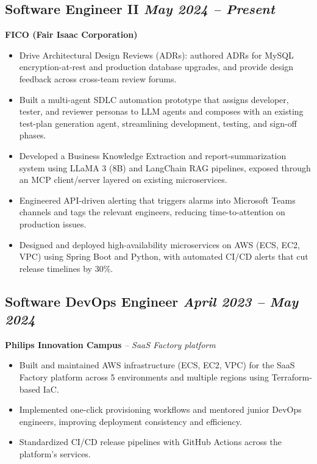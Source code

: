 \documentclass[11pt,a4paper]{article}
\begin{document}
\subsection{Software Engineer II \hfill \textit{May 2024 -- Present}}
\textbf{FICO (Fair Isaac Corporation)}
\begin{itemize}
    \item Drive Architectural Design Reviews (ADRs): authored ADRs for MySQL encryption-at-rest and production database upgrades, and provide design feedback across cross-team review forums.
    \item Built a multi-agent SDLC automation prototype that assigns developer, tester, and reviewer personas to LLM agents and composes with an existing test-plan generation agent, streamlining development, testing, and sign-off phases.
    \item Developed a Business Knowledge Extraction and report-summarization system using LLaMA 3 (8B) and LangChain RAG pipelines, exposed through an MCP client/server layered on existing microservices.
    \item Engineered API-driven alerting that triggers alarms into Microsoft Teams channels and tags the relevant engineers, reducing time-to-attention on production issues.
    \item Designed and deployed high-availability microservices on AWS (ECS, EC2, VPC) using Spring Boot and Python, with automated CI/CD alerts that cut release timelines by 30\%.
\end{itemize}

\subsection{Software DevOps Engineer \hfill \textit{April 2023 -- May 2024}}
\textbf{Philips Innovation Campus} \quad \textit{-- SaaS Factory platform}
\begin{itemize}
    \item Built and maintained AWS infrastructure (ECS, EC2, VPC) for the SaaS Factory platform across 5 environments and multiple regions using Terraform-based IaC.
    \item Implemented one-click provisioning workflows and mentored junior DevOps engineers, improving deployment consistency and efficiency.
    \item Standardized CI/CD release pipelines with GitHub Actions across the platform's services.
\end{itemize}
\end{document}
